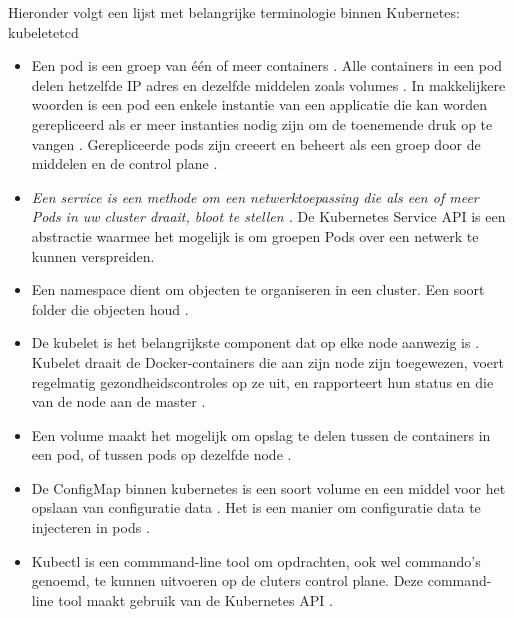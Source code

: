 Hieronder volgt een lijst met belangrijke terminologie binnen Kubernetes:
kubeletetcd
\begin{itemize}
    \item Een pod is een groep van één of meer containers \autocite{habbal-2020}. Alle containers in een pod delen hetzelfde IP adres en dezelfde middelen zoals volumes \autocite{hohn-2020}. In makkelijkere woorden is een pod een enkele instantie van een applicatie die kan worden gerepliceerd als er meer instanties nodig zijn om de toenemende druk op te vangen \autocite{habbal-2020}. Gerepliceerde pods zijn creeert en beheert als een groep door de middelen en de control plane \textcite{KubernetesDocs-2023}. 
    \item \textit{Een service is een methode om een netwerktoepassing die als een of meer Pods in uw cluster draait, bloot te stellen \autocite{KubernetesDocs-2023}.} De Kubernetes Service API is een abstractie waarmee het mogelijk is om groepen Pods over een netwerk te kunnen verspreiden. 
    \item Een namespace dient om objecten te organiseren in een cluster. Een soort folder die objecten houd \autocite{burns-2022}.  
    \item De kubelet is het belangrijkste component dat op elke node aanwezig is \autocite{Vayghan2019}. Kubelet draait de Docker-containers die aan zijn node zijn toegewezen, voert regelmatig gezondheidscontroles op ze uit, en rapporteert hun status en die van de node aan de master \autocite{Vayghan2019}.
    \item Een volume maakt het mogelijk om opslag te delen tussen de containers in een pod, of tussen pods op dezelfde node \autocite{Baier2017}.
    \item De ConfigMap binnen kubernetes is een soort volume en een middel voor het opslaan van configuratie data \autocite{KubernetesDocs-2023}. Het is een manier om configuratie data te injecteren in pods \autocite{KubernetesDocs-2023}.
    \item Kubectl is een commmand-line tool om opdrachten, ook wel commando's genoemd, te kunnen uitvoeren op de cluters control plane. Deze command-line tool maakt gebruik van de Kubernetes API \autocite{KubernetesDocs-2023}. 
\end{itemize}

\lipsum[7-20]
